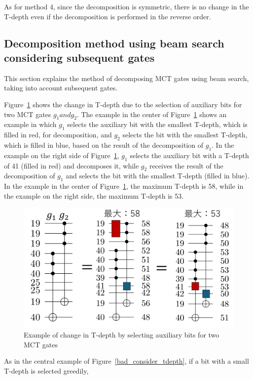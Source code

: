 As for method 4, since the decomposition is symmetric, there is no change in the T-depth even if the decomposition is performed in the reverse order.
\subsection{Decomposition method using beam search considering subsequent gates}
This section explains the method of decomposing MCT gates using beam search, taking into account subsequent gates.

Figure~\ref{select_ancilla_tdepth} shows the change in T-depth due to the selection of auxiliary bits for two MCT gates $g_{1} and g_{2}$.
The example in the center of Figure~\ref{select_ancilla_tdepth} shows an example in which $g_{1}$ selects the auxiliary bit with the smallest T-depth, which is filled in red, for decomposition, and $g_{2}$ selects the bit with the smallest T-depth, which is filled in blue, based on the result of the decomposition of $g_{1}$.
In the example on the right side of Figure~\ref{select_ancilla_tdepth},
$g_{1}$ selects the auxiliary bit with a T-depth of 41 (filled in red) and decomposes it,
while $g_{2}$ receives the result of the decomposition of $g_{1}$ and selects the bit with the smallest T-depth (filled in blue).
In the example in the center of Figure~\ref{select_ancilla_tdepth},
the maximum T-depth is 58,
while in the example on the right side,
the maximum T-depth is 53.
\begin{figure}[tbp]
\centering
\includegraphics[width=0.95\linewidth]{img/select_ancilla_biit_tdepth.pdf}
\caption{Example of change in T-depth by selecting auxiliary bits for two MCT gates}
\label{select_ancilla_tdepth}
\end{figure}
As in the central example of Figure~\ref{bad_consider_tdepth},
if a bit with a small T-depth is selected greedily,

